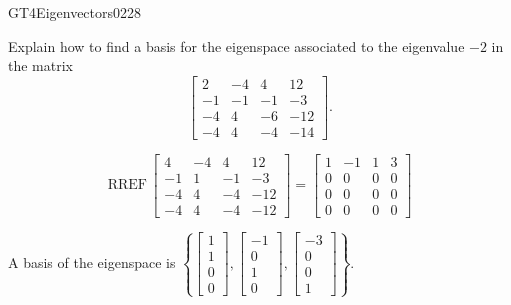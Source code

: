 \begin{exercise}{GT4}{Eigenvectors}{0228} 
\begin{exerciseStatement} 

Explain how to find a basis for the eigenspace associated to the eigenvalue \(-2\) in the matrix \[\left[\begin{array}{cccc}
2 & -4 & 4 & 12 \\
-1 & -1 & -1 & -3 \\
-4 & 4 & -6 & -12 \\
-4 & 4 & -4 & -14
\end{array}\right].\]

 \end{exerciseStatement}
 \begin{exerciseAnswer} 

\[\mathrm{RREF}\,\left[\begin{array}{cccc}
4 & -4 & 4 & 12 \\
-1 & 1 & -1 & -3 \\
-4 & 4 & -4 & -12 \\
-4 & 4 & -4 & -12
\end{array}\right]=\left[\begin{array}{cccc}
1 & -1 & 1 & 3 \\
0 & 0 & 0 & 0 \\
0 & 0 & 0 & 0 \\
0 & 0 & 0 & 0
\end{array}\right]\]

 

A basis of the eigenspace is \(\left\{ \left[\begin{array}{c}
1 \\
1 \\
0 \\
0
\end{array}\right] , \left[\begin{array}{c}
-1 \\
0 \\
1 \\
0
\end{array}\right] , \left[\begin{array}{c}
-3 \\
0 \\
0 \\
1
\end{array}\right] \right\}\).

 \end{exerciseAnswer}
 \end{exercise}


